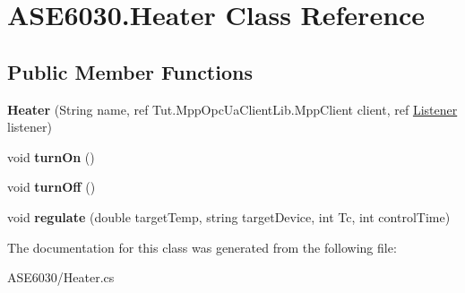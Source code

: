 \hypertarget{class_a_s_e6030_1_1_heater}{}\section{A\+S\+E6030.\+Heater Class Reference}
\label{class_a_s_e6030_1_1_heater}
\subsection*{Public Member Functions}
\begin{DoxyCompactItemize}
\item 
\mbox{\label{class_a_s_e6030_1_1_heater_a1c0420d0f56eb7e1a7d43c44520ae07b}} 
{\bfseries Heater} (String name, ref Tut.\+Mpp\+Opc\+Ua\+Client\+Lib.\+Mpp\+Client client, ref \hyperlink{class_a_s_e6030_1_1_listener}{Listener} listener)
\item 
\mbox{\label{class_a_s_e6030_1_1_heater_a0ef024666587dbe494c647214658b412}} 
void {\bfseries turn\+On} ()
\item 
\mbox{\label{class_a_s_e6030_1_1_heater_a38a0281112b0ab7d5922e52d0a2cecec}} 
void {\bfseries turn\+Off} ()
\item 
\mbox{\label{class_a_s_e6030_1_1_heater_a6b695a9e9acf4ae4947bf3a968c8e6e3}} 
void {\bfseries regulate} (double target\+Temp, string target\+Device, int Tc, int control\+Time)
\end{DoxyCompactItemize}


The documentation for this class was generated from the following file\+:\begin{DoxyCompactItemize}
\item 
A\+S\+E6030/Heater.\+cs\end{DoxyCompactItemize}
